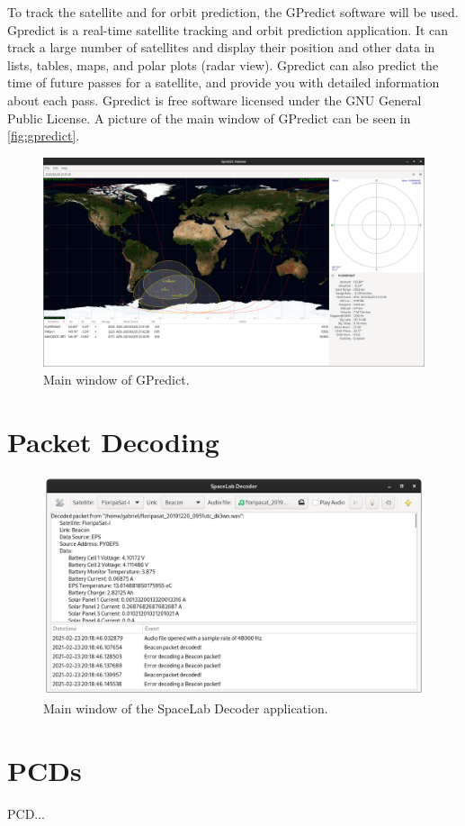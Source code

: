 To track the satellite and for orbit prediction, the GPredict software \cite{gpredict} will be used. Gpredict is a real-time satellite tracking and orbit prediction application. It can track a large number of satellites and display their position and other data in lists, tables, maps, and polar plots (radar view). Gpredict can also predict the time of future passes for a satellite, and provide you with detailed information about each pass. Gpredict is free software licensed under the GNU General Public License. A picture of the main window of GPredict can be seen in \autoref{fig:gpredict}.

\begin{figure}[!ht]
    \begin{center}
        \includegraphics[width=\textwidth]{figures/gpredict.png}
        \caption{Main window of GPredict.}
        \label{fig:gpredict}
    \end{center}
\end{figure}

\section{Packet Decoding}

\cite{spacelab-decoder}

\begin{figure}[!ht]
    \begin{center}
        \includegraphics[width=\textwidth]{figures/spacelab-decoder.png}
        \caption{Main window of the SpaceLab Decoder application.}
        \label{fig:spacelab-decoder}
    \end{center}
\end{figure}

\section{PCDs}

PCD...
